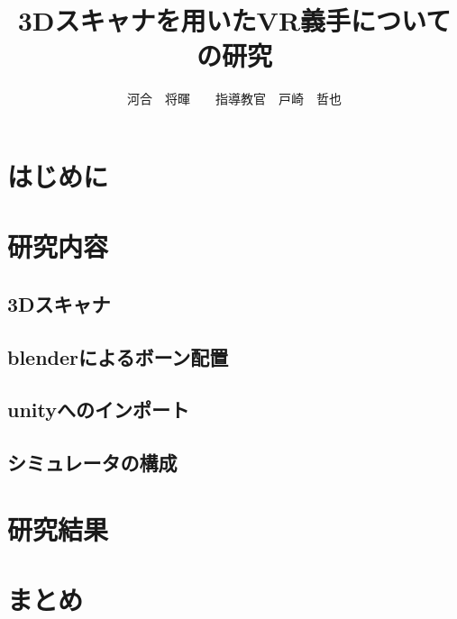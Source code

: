 \documentclass[twocolumn]{jsarticle}
\title{3Dスキャナを用いたVR義手についての研究}
\author{河合　将暉　　指導教官　戸崎　哲也}
\date{}
\begin{document}
\maketitle

\section{はじめに}
	
	\section{研究内容}
		\subsection{3Dスキャナ}
		\subsection{blenderによるボーン配置}
		\subsection{unityへのインポート}
		\subsection{シミュレータの構成}

\section{研究結果}
	
\section{まとめ}


\begin{thebibliography}{99}
\end{thebibliography}
\end{document}
